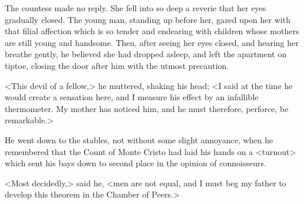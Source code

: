  The countess made no reply. She fell into so deep a reverie that her eyes gradually closed. The young man, standing up before her, gazed upon her with that filial affection which is so tender and endearing with children whose mothers are still young and handsome. Then, after seeing her eyes closed, and hearing her breathe gently, he believed she had dropped asleep, and left the apartment on tiptoe, closing the door after him with the utmost precaution. 

 <This devil of a fellow,> he muttered, shaking his head; <I said at the time he would create a sensation here, and I measure his effect by an infallible thermometer. My mother has noticed him, and he must therefore, perforce, be remarkable.> 

 He went down to the stables, not without some slight annoyance, when he remembered that the Count of Monte Cristo had laid his hands on a <turnout> which sent his bays down to second place in the opinion of connoisseurs. 

 <Most decidedly,> said he, <men are not equal, and I must beg my father to develop this theorem in the Chamber of Peers.> 
